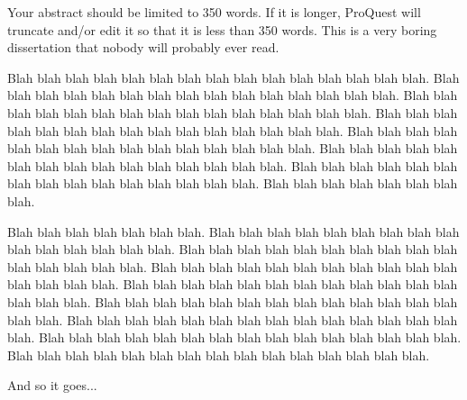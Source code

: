 Your abstract should be limited to 350 words. If it is longer, ProQuest will truncate and/or edit it so that it is less than 350 words. This is a very boring dissertation that nobody will probably ever read.
\par
Blah blah blah blah blah blah blah blah blah blah blah blah blah blah blah. Blah blah blah blah blah blah blah blah blah blah blah blah blah blah blah. Blah blah blah blah blah blah blah blah blah blah blah blah blah blah blah. Blah blah blah blah blah blah blah blah blah blah blah blah blah blah blah. Blah blah blah blah blah blah blah blah blah blah blah blah blah blah blah. Blah blah blah blah blah blah blah blah blah blah blah blah blah blah blah.  Blah blah blah blah blah blah blah blah blah blah blah blah blah blah blah. Blah blah blah blah blah blah blah blah.
\par
Blah blah blah blah blah blah blah. Blah blah blah blah blah blah blah blah blah blah blah blah blah blah blah. Blah blah blah blah blah blah blah blah blah blah blah blah blah blah blah. Blah blah blah blah blah blah blah blah blah blah blah blah blah blah blah. Blah blah blah blah blah blah blah blah blah blah blah blah blah blah blah. Blah blah blah blah blah blah blah blah blah blah blah blah blah blah blah. Blah blah blah blah blah blah blah blah blah blah blah blah blah blah blah. Blah blah blah blah blah blah blah blah blah blah blah blah blah blah blah. Blah blah blah blah blah blah blah blah blah blah blah blah blah blah blah.
\par
And so it goes...